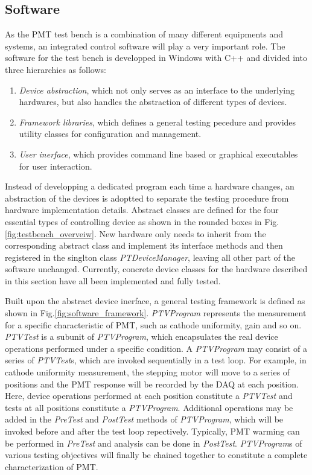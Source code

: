 \documentclass[review, times]{elsarticle}
\begin{document}
\subsection{Software}
\label{sec:software}

As the PMT test bench is a combination of many different equipments and systems, an integrated control software will play a very important role. 
The software for the test bench is developped in Windows with C++ and divided into three hierarchies as follows:
\begin{enumerate}
 \item \textit{Device abstraction}, which not only serves as an interface to the underlying hardwares, but also handles the abstraction of different types of devices. 
 \item \textit{Framework libraries}, which defines a general testing pecedure and provides utility classes for configuration and management.
 \item \textit{User inerface}, which provides command line based or graphical executables for user interaction. 
\end{enumerate}

Instead of developping a dedicated program each time a hardware changes, an abstraction of the devices is adoptted to separate the testing procedure from hardware implementation details. 
Abstract classes are defined for the four essential types of controlling device as shown in the rounded boxes in Fig.\ref{fig:testbench_overveiw}.
New hardware only needs to inherit from the corresponding abstract class and implement its interface methods and then registered in the singlton class \textit{PTDeviceManager}, leaving all other part of the software unchanged.
Currently, concrete device classes for the hardware described in this section have all been implemented and fully tested.

Built upon the abstract device inerface, a general testing framework is defined as shown in Fig.\ref{fig:software_framework}.
\textit{PTVProgram} represents the measurement for a specific characteristic of PMT, such as cathode uniformity, gain and so on.
\textit{PTVTest} is a subunit of \textit{PTVProgram}, which encapsulates the real device operations performed under a specific condition.
A \textit{PTVProgram} may consist of a series of \textit{PTVTest}s, which are invoked sequentially in a test loop.
For example, in cathode uniformity measurement, the stepping motor will move to a series of positions and the PMT response will be recorded by the DAQ at each position.
Here, device operations performed at each position constitute a \textit{PTVTest} and tests at all positions constitute a \textit{PTVProgram}.
Additional operations may be added in the \textit{PreTest} and \textit{PostTest} methods of \textit{PTVProgram}, which will be invoked before and after the test loop repectively.
Typically, PMT warming can be performed in \textit{PreTest} and analysis can be done in \textit{PostTest}.
\textit{PTVProgram}s of various testing objectives will finally be chained together to constitute a complete characterization of PMT.
\end{document}
